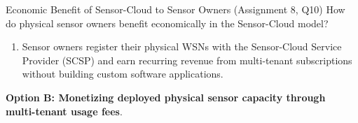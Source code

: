 \begin{solved}{Economic Benefit of Sensor-Cloud to Sensor Owners (Assignment 8, Q10)}
\Given How do physical sensor owners benefit economically in the Sensor-Cloud model?
\Steps
\begin{enumerate}[leftmargin=*]
  \item Sensor owners register their physical WSNs with the Sensor-Cloud Service Provider (SCSP) and earn recurring revenue from multi-tenant subscriptions without building custom software applications.
\end{enumerate}
\Answer \textbf{Option B: Monetizing deployed physical sensor capacity through multi-tenant usage fees}.
\end{solved}
